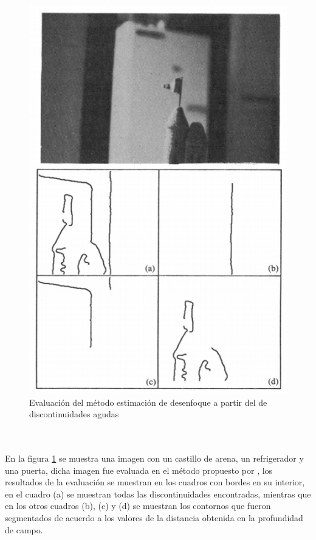 \begin{figure}[ht]
\centering
\includegraphics[scale=0.50]{GraficosEdArt/EvaluacionUSE.PNG} 
\caption{Evaluación del método estimación de desenfoque a partir del de discontinuidades agudas \citet{Pentland}}
\label{fig2}
\end{figure}
\\
\\
En la figura \ref{fig2} se muestra una imagen con un castillo de arena, un refrigerador y una puerta, dicha imagen fue evaluada en el método propuesto por \citet{Pentland}, los resultados de la evaluación se muestran en los cuadros con bordes en su interior, en el cuadro (a) se muestran todas las discontinuidades encontradas, mientras que en los otros cuadros (b), (c) y (d) se muestran los contornos que fueron segmentados de acuerdo a los valores de la distancia obtenida en la profundidad de campo.
\\
